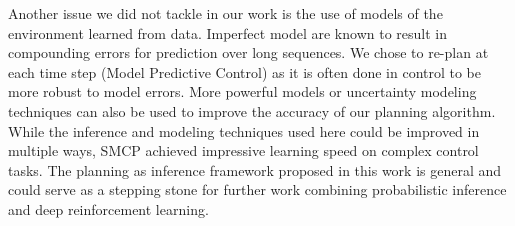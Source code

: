 Another issue we did not tackle in our work is the use of models of the environment learned from data. Imperfect model are known to result in compounding errors for prediction over long sequences. We chose to re-plan at each time step (Model Predictive Control) as it is often done in control to be more robust to model errors. More powerful models or uncertainty modeling techniques can also be used to improve the accuracy of our planning algorithm.
While the inference and modeling techniques used here could be improved in multiple ways, SMCP achieved impressive learning speed on complex control tasks. The planning as inference framework proposed in this work is general and could serve as a stepping stone for further work combining probabilistic inference and deep reinforcement learning.


